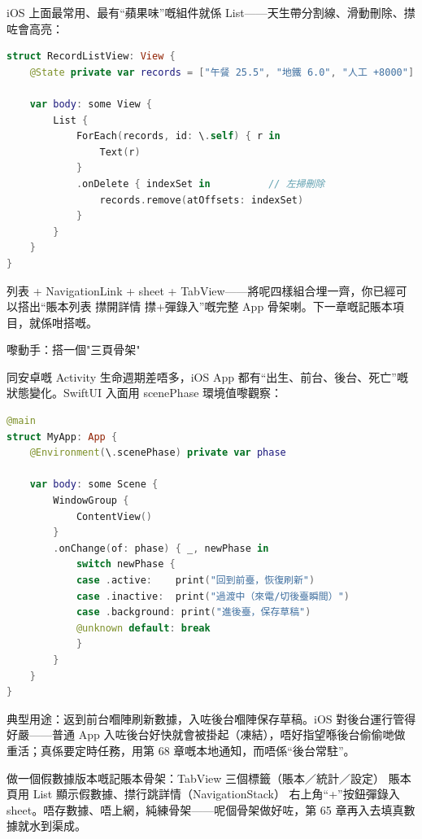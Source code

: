 iOS 上面最常用、最有“蘋果味”嘅組件就係 List——天生帶分割線、滑動刪除、㩒咗會高亮：

\begin{lstlisting}[language=Swift]
struct RecordListView: View {
    @State private var records = ["午餐 25.5", "地鐵 6.0", "人工 +8000"]

    var body: some View {
        List {
            ForEach(records, id: \.self) { r in
                Text(r)
            }
            .onDelete { indexSet in          // 左掃刪除
                records.remove(atOffsets: indexSet)
            }
        }
    }
}
\end{lstlisting}

列表 + NavigationLink + sheet + TabView——將呢四樣組合埋一齊，你已經可以搭出“賬本列表 㩒開詳情 㩒+彈錄入”嘅完整 App 骨架喇。下一章嘅記賬本項目，就係咁搭嘅。

\begin{tcbpractice}{嚟動手：搭一個"三頁骨架"}

同安卓嘅 Activity 生命週期差唔多，iOS App 都有“出生、前台、後台、死亡”嘅狀態變化。SwiftUI 入面用 scenePhase 環境值嚟觀察：

\begin{lstlisting}[language=Swift]
@main
struct MyApp: App {
    @Environment(\.scenePhase) private var phase

    var body: some Scene {
        WindowGroup {
            ContentView()
        }
        .onChange(of: phase) { _, newPhase in
            switch newPhase {
            case .active:    print("回到前臺，恢復刷新")
            case .inactive:  print("過渡中（來電/切後臺瞬間）")
            case .background: print("進後臺，保存草稿")
            @unknown default: break
            }
        }
    }
}
\end{lstlisting}

典型用途：返到前台嗰陣刷新數據，入咗後台嗰陣保存草稿。iOS 對後台運行管得好嚴——普通 App 入咗後台好快就會被掛起（凍結），唔好指望喺後台偷偷哋做重活；真係要定時任務，用第 68 章嘅本地通知，而唔係“後台常駐”。

做一個假數據版本嘅記賬本骨架：TabView 三個標籤（賬本／統計／設定） 賬本頁用 List 顯示假數據、㩒行跳詳情（NavigationStack） 右上角“+”按鈕彈錄入 sheet。唔存數據、唔上網，純練骨架——呢個骨架做好咗，第 65 章再入去填真數據就水到渠成。

\end{tcbpractice}


